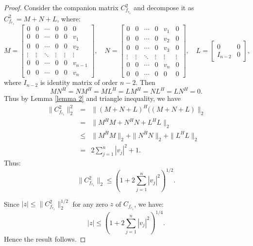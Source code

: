 \documentclass [12pt]{article}
\begin{document}
\begin{proof}
Consider the companion matrix  $C_{f_{r_{1}}}^2$ and decompose it as $C_{f_{r_{1}}}^2 = M + N + L$, where:
\[
M = 
\begin{bmatrix}
0 & 0 & \cdots & 0&0 & 0 \\
0 & 0 & \cdots & 0&0& v_{1} \\
0 & 0 & \cdots & 0 &0& v_{2} \\
\vdots  &\vdots & \ddots &\vdots& \vdots & \vdots \\
0 & 0 & \cdots & 0 & 0&v_{n-1}\\
0 & 0 & \cdots & 0 & 0&v_{n}
\end{bmatrix},
\quad
N = 
\begin{bmatrix}
0 & 0 & \cdots & 0&v_{1} & 0 \\
0 & 0 & \cdots & 0&v_{2}& 0 \\
0 & 0 & \cdots & 0 &v_{3}& 0 \\
\vdots  &\vdots & \ddots &\vdots& \vdots & \vdots \\
0 & 0 & \cdots & 0 & v_{n}&0\\
0 & 0 & \cdots & 0 & 0&0
\end{bmatrix},
\quad
L = 
\begin{bmatrix}
0 & 0 \\
I_{n-2} & 0
\end{bmatrix},
\]
where $I_{n-2} $ is identity matrix of order $n-2.$
Then
\[
 MN^{H}=NM^{H}=ML^{H}  = LM^{H} =   NL^{H}  =L N^{H}= 0.
\] Thus by Lemma \ref{lemma 2} and triangle inequality, we have
\begin{eqnarray*}
    \|C_{f_{r_{1}}}^2\|^2_{2} &=&\|(M +N +L)^{H}((M +N +L)\|_{2}\\&= & \|M^{H}M+N^{H}N+L^{H}L\|_{2}\\&\le&  \|M^{H}M\|_{2} + \|N^{H}N\|_{2} + \|L^{H}L\|_{2}\\&=&  2 \sum_{j=1}^{n} |v_j|^2+1.
\end{eqnarray*}
Thus:
\[
\|C_{f_{r_{1}}}^2\|_{2} \leq \left(1 + 2 \sum_{j=1}^{n} |v_j|^2 \right)^{1/2}.
\]

Since $|z| \leq \|C_{f_{r_{1}}}^2\|^{1/2}_{2}$ for any zero $z$ of $C_{f_{r_{1}}}$, we have:
\[
|z| \leq \left(1 + 2 \sum_{j=1}^{n} |v_j|^2 \right)^{1/4}.\]
Hence the result follows.
\end{proof}
\end{document}

